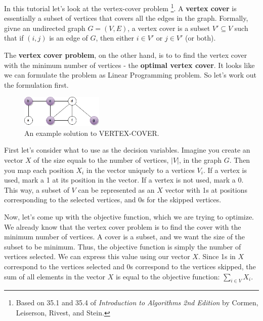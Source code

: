 \documentclass{article}
\begin{document}
In this tutorial let's look at the vertex-cover problem 
\footnote{Based on 35.1 and 35.4 of {\it Introduction to Algorithms
2nd Edition} by Cormen, Leiserson, Rivest, and Stein.}. 
A {\bf vertex cover} is essentially a subset of vertices that covers all the 
edges in the graph.
Formally, givne an undirected graph $G = (V, E)$, a vertex cover is a subset
$V' \subseteq V$ such that if $(i, j)$ is an edge of $G$, then either
$i \in V'$ or $j \in V'$ (or both).

The {\bf vertex cover problem}, on the other hand, is to to find the vertex
cover with the minimum number of vertices - the {\bf optimal vertex cover}.
It looks like we can formulate the problem as Linear Programming problem.
So let's work out the formulation first.
\begin{figure}[H]
\centering
\includegraphics[width=0.35\textwidth]{vertexcover1.png}
\caption{An example solution to VERTEX-COVER.}
\end{figure}

First let's consider what to use as the decision variables.
Imagine you create an vector $X$ of the size equals to the number of vertices, 
$|V|$, in the graph $G$. 
Then you map each position $X_i$ in the vector uniquely to a vertices $V_i$.
If a vertex is used, mark a 1 at its position in the vector. If a vertex
is not used, mark a 0.
This way, a subset of $V$ can be represented as an $X$ vector with 1s at
positions corresponding to the selected vertices, and 0s for the skipped
vertices.

Now, let's come up with the objective function, which we are trying to optimize.
We already know that the vertex cover problem is to find the cover with
the minimum number of vertices. A cover is a subset, and we want the size
of the subset to be minimum. Thus, the objective function is simply the
number of vertices selected. We can express this value using our vector $X$.
Since 1s in $X$ correspond to the vertices selected and 0s correspond to the
vertices skipped, the sum of all elements in the vector $X$ is equal to the
objective function: $\sum_{i \in V} X_i$.
\end{document}
